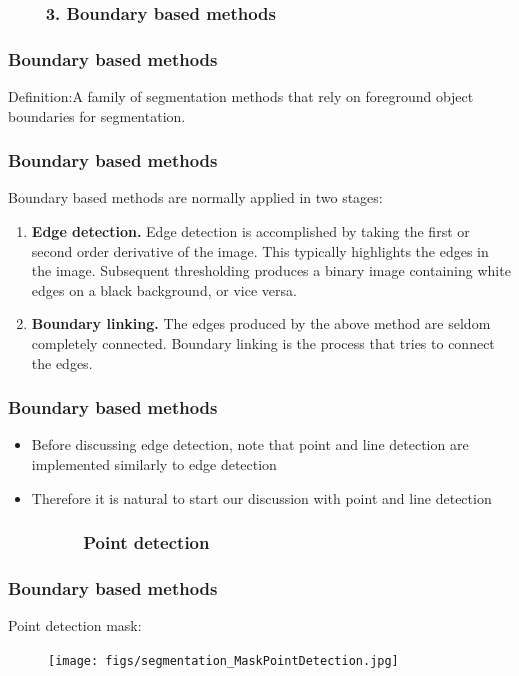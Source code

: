 \subsubsection{\ \ \ \ 3. Boundary based methods}
\begin{frame}
\frametitle{Boundary based methods}
\logoCSIPCPL\mypagenum
	\begin{block}{Definition:}A family of segmentation methods that rely on foreground object boundaries for segmentation.
	\end{block}
\end{frame}





\begin{frame}
\frametitle{Boundary based methods}
\logoCSIPCPL\mypagenum
	Boundary based methods are normally applied in two stages:
	\begin{enumerate}
		\item \textbf{Edge detection.}  Edge detection is accomplished by taking the first or second order derivative of the image.  This typically highlights the edges in the image.  Subsequent thresholding produces a binary image containing white edges on a black background, or vice
versa.
		\item \textbf{Boundary linking.}  The edges produced by the above method
are seldom completely connected.  Boundary linking is the process that tries to connect the edges.
	\end{enumerate}
\end{frame}





\begin{frame}
\frametitle{Boundary based methods}
\logoCSIPCPL\mypagenum
	\begin{itemize}
		\item Before discussing edge detection, note that point and line detection are implemented similarly to edge detection
		\item Therefore it is natural to start our discussion with point and line detection
	\end{itemize}
\end{frame}






\subsubsection{\ \ \ \ \ \ \ \ Point detection}
\begin{frame}
\frametitle{Boundary based methods}
\logoCSIPCPL\mypagenum
	Point detection mask:
	\begin{figure}[!htp]
		\texttt{[image: figs/segmentation\_MaskPointDetection.jpg]}
	\end{figure}
\end{frame}






